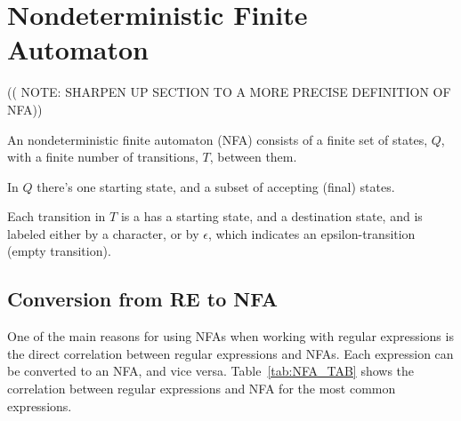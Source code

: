 \section{Nondeterministic Finite Automaton}
(( NOTE: SHARPEN UP SECTION TO A MORE PRECISE DEFINITION OF NFA))

\begin{mydef}
An nondeterministic finite automaton (NFA) consists of a finite set of states, $Q$, with a finite number of transitions, $T$, between them.


In $Q$ there's one starting state, and a subset of accepting (final) states.

Each transition in $T$ is a has a starting state, and a destination state, and is labeled either by a character, or by $\epsilon$, which indicates an epsilon-transition (empty transition).
\end{mydef}

\subsection{Conversion from RE to NFA}
\label{RA_TO_NFA}
One of the main reasons for using NFAs when working with regular expressions is the direct correlation between regular expressions and NFAs. Each expression can be converted to an NFA, and vice versa. Table~\ref{tab:NFA_TAB} shows the correlation between regular expressions and NFA for the most common expressions.

